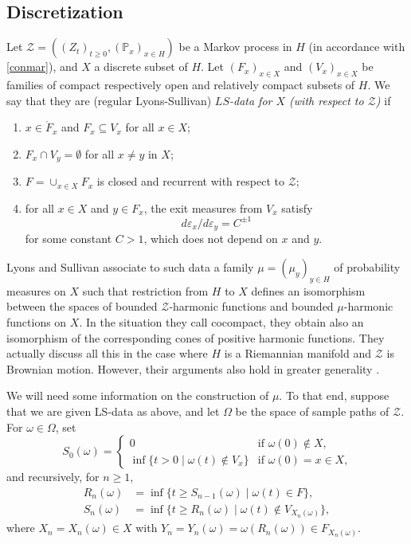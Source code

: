 \documentclass[12pt,a4paper]{amsart}
\numberwithin{equation}{section}
\theoremstyle{definition}
\def\p{\mathbb P}
\def\ve{\varepsilon}
\begin{document}
\subsection{Discretization}\label{ssecls}
Let $\mathcal{Z}=((Z_t)_{t\ge0},(\p_x)_{x\in H})$ be a Markov process in $H$ (in accordance with \ref{conmar}),
and $X$ a discrete subset of $H$.
Let $(F_x)_{x\in X}$ and $(V_x)_{x\in X}$ be families of compact respectively open and relatively compact subsets of $H$.
We say that they are (regular Lyons-Sullivan) \emph{$LS$-data for $X$ (with respect to $\mathcal{Z}$)} if
\begin{enumerate}[label=(D\arabic*)]
\item\label{d1}
$x\in\mathring{F}_x$ and $F_x\subseteq V_x$ for all $x\in X$;
\item\label{d2}
$F_x\cap V_y=\emptyset$ for all $x\ne y$ in $X$;
\item\label{d3}
$F=\cup_{x\in X}F_x$ is closed and recurrent with respect to $\mathcal Z$;
\item\label{d4}
for all $x\in X$ and $y\in F_x$, the exit measures from $V_x$ satisfy
\begin{equation*}
  d\ve_x/d\ve_y = C^{\pm1}
\end{equation*}
for some constant $C>1$, which does not depend on $x$ and $y$.
\end{enumerate}
Lyons and Sullivan associate to such data a family $\mu=(\mu_y)_{y\in H}$ of probability measures on $X$ such that restriction from $H$ to $X$ defines an isomorphism between the spaces of bounded $\mathcal{Z}$-harmonic functions and bounded $\mu$-harmonic functions on $X$.
In the situation they call cocompact, they obtain also an isomorphism of the corresponding cones of positive harmonic functions.
They actually discuss all this in the case where $H$ is a Riemannian manifold and $\mathcal{Z}$ is Brownian motion.
However, their arguments also hold in greater generality \cite{BP}. 

We will need some information on the construction of $\mu$.
To that end, suppose that we are given LS-data as above, and let $\Omega$ be the space of sample paths of $\mathcal{Z}$.
For $\omega\in\Omega$, set
\begin{equation}\label{s0}
  S_0(\omega)= 
  \begin{cases}
  0 &\text{if $\omega(0)\notin X$}, \\
  \inf \{ t>0 \mid \omega(t)\notin V_x\} &\text{if $\omega(0)=x\in X$,}
\end{cases}
\end{equation}
and recursively, for $n\ge1$,
\begin{equation}\label{rs}
\begin{split}
  R_n(\omega) &= \inf \{ t\ge S_{n-1}(\omega) \mid \omega(t)\in F \}, \\
  S_n(\omega) &= \inf \{ t\ge R_n(\omega) \mid \omega(t)\notin V_{X_n(\omega)} \},
\end{split}
\end{equation}
where $X_n=X_n(\omega)\in X$ with $Y_n=Y_n(\omega)=\omega(R_n(\omega))\in F_{X_n(\omega)}$.
\end{document}
